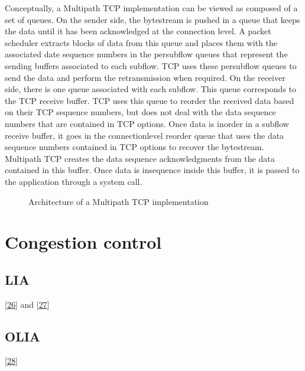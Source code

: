 \documentclass[letterpaper,10pt,english]{sphinxmanual}
\begin{document}
Conceptually, a Multipath TCP implementation can be viewed as composed of a set of queues. On the sender side, the bytestream is pushed in a queue that keeps the data until it has been acknowledged at the connection level. A packet scheduler extracts blocks of data from this queue and places them with the associated date sequence numbers in the per\sphinxhyphen{}subflow queues that represent the sending buffers associated to each subflow. TCP uses these per\sphinxhyphen{}subflow queues to send the data and perform the retransmission when required. On the receiver side, there is one queue associated with each subflow. This queue corresponds to the TCP receive buffer. TCP uses this queue to reorder the received data based on their TCP sequence numbers, but does not deal with the data sequence numbers that are contained in TCP options. Once data is in\sphinxhyphen{}order in a subflow receive buffer, it goes in the connection\sphinxhyphen{}level reorder queue that uses the data sequence numbers contained in TCP options to recover the bytestream. Multipath TCP creates the data sequence acknowledgments from the data contained in this buffer. Once data is in\sphinxhyphen{}sequence inside this buffer, it is passed to the application through a  system call.
\begin{figure}[htbp]\centering\capstart{}\caption{Architecture of a Multipath TCP implementation}\label{\detokenize{mptcp:id72}}\end{figure}

\section{Congestion control}
\label{\detokenize{mptcp:congestion-control}}\label{\detokenize{mptcp:mptcp-congestion}}

\subsection{LIA}
\label{\detokenize{mptcp:lia}}
\sphinxAtStartPar
{[}\hyperlink{cite.biblio:id8932}{26}{]} and {[}\hyperlink{cite.biblio:id6203}{27}{]}


\subsection{OLIA}
\label{\detokenize{mptcp:olia}}
\sphinxAtStartPar
{[}\hyperlink{cite.biblio:id8951}{28}{]}
\end{document}
